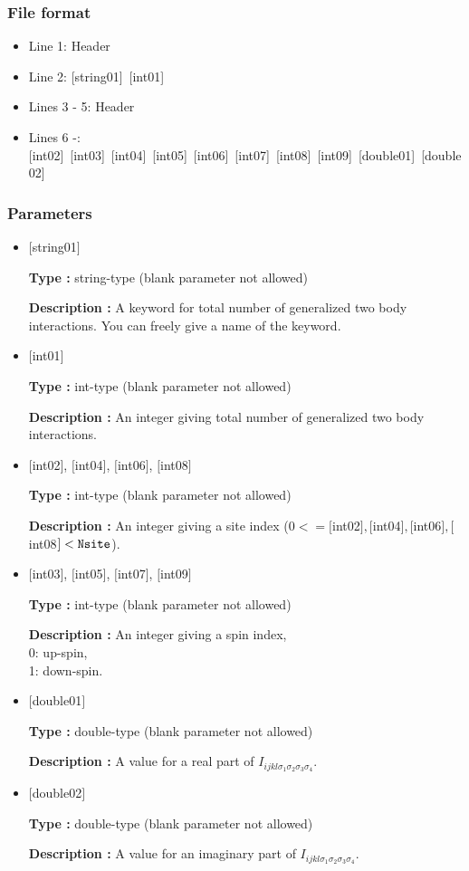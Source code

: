 \subsubsection{File format}
 \begin{itemize}
   \item  Line 1:  Header
   \item  Line 2:   [string01]~[int01]
   \item  Lines 3 - 5:  Header
   \item  Lines 6 -:
   [int02]~[int03]~[int04]~[int05]~[int06]~[int07]~[int08]~[int09]~[double01]~[double02] 
  \end{itemize}
\subsubsection{Parameters}
 \begin{itemize}

   \item  $[$string01$]$
   
    {\bf Type :} string-type (blank parameter not allowed)

   {\bf Description :} A keyword for total number of generalized two body interactions. You can freely give a name of the keyword.

   \item  $[$int01$]$
   
    {\bf Type :} int-type (blank parameter not allowed)

   {\bf Description :} An integer giving total number of generalized two body interactions.

  \item  $[$int02$]$, $[$int04$]$, $[$int06$]$, $[$int08$]$

 {\bf Type :} int-type (blank parameter not allowed)

{\bf Description :} An integer giving a site index ($0<= [$int02$],  [$int04$], [$int06$], [$int08$]<\verb|Nsite|$).
 
  \item  $[$int03$]$, $[$int05$]$, $[$int07$]$, $[$int09$]$

 {\bf Type :} int-type (blank parameter not allowed)

{\bf Description :}  An integer giving a spin index,\\
0: up-spin,\\
1: down-spin.

 \item  $[$double01$]$
   
   {\bf Type :} double-type (blank parameter not allowed)

  {\bf Description :}  A value for a real part of $I_{ijkl\sigma_1\sigma_2\sigma_3\sigma_4}$.

 \item  $[$double02$]$
   
   {\bf Type :} double-type (blank parameter not allowed)

  {\bf Description :} A value for an imaginary part of $I_{ijkl\sigma_1\sigma_2\sigma_3\sigma_4}$.
\end{itemize}

